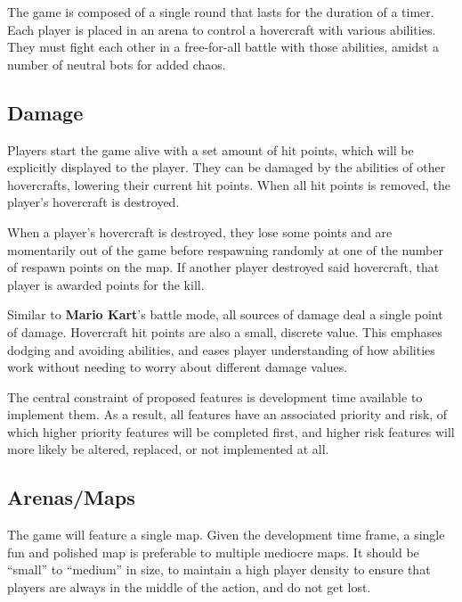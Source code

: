 \documentclass{article}
\theoremstyle{definition}
\begin{document}
The game is composed of a single round that lasts for the duration of a timer.
Each player is placed in an arena to control a hovercraft with various
abilities. They must fight each other in a free-for-all battle with those
abilities, amidst a number of neutral bots for added chaos.

\subsection{Damage}

Players start the game alive with a set amount of hit points, which will be
explicitly displayed to the player. They can be damaged by the abilities of
other hovercrafts, lowering their current hit points. When all hit points is
removed, the player's hovercraft is destroyed.

When a player's hovercraft is destroyed, they lose some points and are
momentarily out of the game before respawning randomly at one of the number of
respawn points on the map. If another player destroyed said hovercraft, that
player is awarded points for the kill.

Similar to \textbf{Mario Kart}'s battle mode, all sources of damage deal
a single point of damage. Hovercraft hit points are also a small, discrete value.
This emphases dodging and avoiding abilities, and eases player understanding of
how abilities work without needing to worry about different damage values.

The central constraint of proposed features is development time available to
implement them. As a result, all features have an associated priority and risk,
of which higher priority features will be completed first, and higher risk
features will more likely be altered, replaced, or not implemented at all.


\subsection{Arenas/Maps}

The game will feature a single map. Given the development time frame, a single
fun and polished map is preferable to multiple mediocre maps. It should be
``small'' to ``medium'' in size, to maintain a high player density to ensure
that players are always in the middle of the action, and do not get lost.
\end{document}
